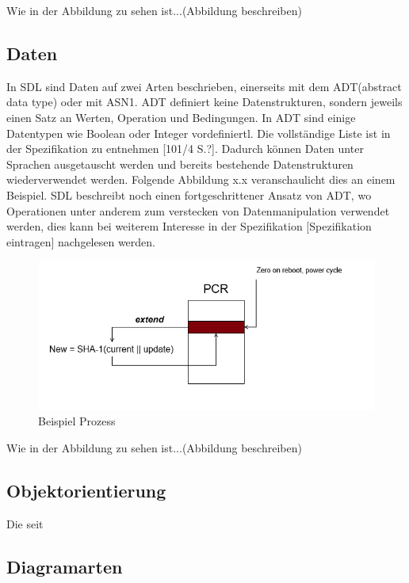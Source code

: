 Wie in der Abbildung zu sehen ist...(Abbildung beschreiben)

\subsection{Daten}
\label{ssc:Daten}
In \ac{SDL} sind Daten auf zwei Arten beschrieben, einerseits mit dem \ac{ADT}(abstract data type) oder mit \ac{ASN1}. \ac{ADT} definiert keine 
Datenstrukturen, sondern jeweils einen Satz an Werten, Operation und Bedingungen. In \ac{ADT} sind einige Datentypen wie Boolean oder Integer vordefiniertl. Die vollständige Liste ist in der Spezifikation zu entnehmen [101/4 S.?].  Dadurch können Daten unter Sprachen ausgetauscht werden und bereits bestehende Datenstrukturen wiederverwendet werden. Folgende 
Abbildung x.x veranschaulicht dies an einem Beispiel. \ac{SDL} beschreibt noch einen 
fortgeschrittener Ansatz von \ac{ADT}, wo Operationen unter anderem zum verstecken von 
Datenmanipulation verwendet werden, dies kann bei weiterem Interesse in der Spezifikation 
[Spezifikation eintragen] nachgelesen werden. 


\begin{figure}[ht]
	\centering
	\includegraphics[width=1\textwidth]{test.png}
	\caption{Beispiel Prozess}
	\label{fig:BspProzess}
\end{figure}

Wie in der Abbildung zu sehen ist...(Abbildung beschreiben)
   
\subsection{Objektorientierung} 
\label{ssc:Vererbung}
Die seit


\subsection{Diagramarten}
\label{ssc:Diagramarten}

